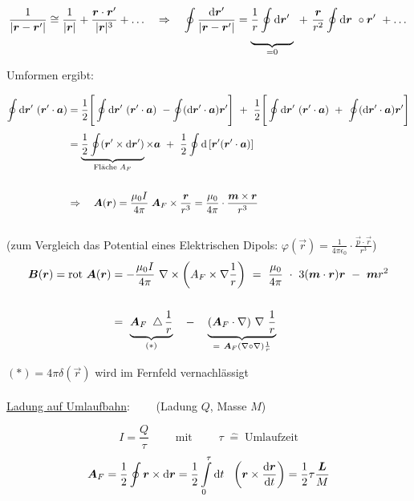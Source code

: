 \begin{equation*}
\frac{1}{|\vec{r}-\vec{r}'|} \cong  \frac{1}{|\vec{r}|} + \frac{\vec{r}\cdot\vec{r}'}{|\vec{r}|^3} + \dotsc \quad \Rightarrow \quad \oint\frac{\mathrm{d}\vec{r}'}{|\vec{r}-\vec{r}'|} = \underbrace{\frac{1}{r} \Oint{}{}{\vec{r}'}}_{=0} \ + \ \frac{\vec{r}}{r^2}\Oint{}{}{\vec{r}} \circ\vec{r}' \ + \dotsc
\end{equation*}

Umformen ergibt:

\begin{align*}
\Oint{}{}{\vec{r}'} (\vec{r}'\cdot\vec{a}) &= \frac{1}{2}\Bigg[\Oint{}{}{\vec{r}'}(\vec{r}'\cdot\vec{a}) \ - \oint(\mathrm{d}\vec{r}'\cdot\vec{a})\vec{r}'\Bigg] \ + \ \frac{1}{2} \Bigg[\Oint{}{}{\vec{r}'}(\vec{r}'\cdot\vec{a}) \ + \ \oint(\mathrm{d}\vec{r}'\cdot\vec{a})\vec{r}'\Bigg]\\
&= \underbrace{\frac{1}{2}\oint(\vec{r}'\times\mathrm{d}\vec{r}')}_{\text{Fläche }A_F} \times\vec{a} \ + \ \frac{1}{2} \oint\mathrm{d}\left[\vec{r}'(\vec{r}'\cdot\vec{a})\right]\\ 
\ \\
& \Rightarrow \quad \vec{A}(\vec{r}) = \frac{\mu_0 I }{4\pi} \; \vec{A}_F\times\frac{\vec{r}}{r^3} = \frac{\mu_0}{4\pi} \cdot \frac{\vec{m}\times\vec{r}}{r^3}
\end{align*}
\ \\
(zum Vergleich das Potential eines Elektrischen Dipols: $\varphi(\vec{r}) = \frac{1}{4\pi\epsilon_0} \cdot \frac{\vec{p}\cdot\vec{r}}{r^3}$)
\ \\
\begin{align*}
\vec{B}(\vec{r}) = \rot\vec{A}(\vec{r}) &= - \frac{\mu_0 I}{4\pi} \ \nabla \times \left(A_F\times\nabla\frac{1}{r}\right) \ = \ \frac{\mu_0}{4\pi} \ \cdot \ 3(\vec{m}\cdot\vec{r})\vec{r} \ - \ \vec{m}r^2\\
\ \\
&= \ \underbrace{\vec{A}_F \ \laplace\frac{1}{r}}_{(*)} \quad - \quad \underbrace{(\vec{A}_F
\cdot\nabla)\ \nabla \ \frac{1}{r}}_{= \ \vec{A}_F (\nabla \circ \nabla) \frac{1}{r}}
\end{align*}

$(*) = 4\pi\delta(\vec{r})$ wird im Fernfeld vernachlässigt
\ \\
\ \\
\underline{Ladung auf Umlaufbahn}:$\qquad$ (Ladung $Q$, Masse $M$)

\begin{equation*}
I = \frac{Q}{\tau} \qquad \text{ mit } \qquad \tau \; \hat{=} \; \text{Umlaufzeit}
\end{equation*}
\begin{equation*}
\vec{A}_F = \frac{1}{2}\oint\vec{r}\times\mathrm{d}\vec{r} = \frac{1}{2}\Int{0}{\tau}{t} \ \left(\vec{r}\times\diff{\vec{r}}{t}\right) =\frac{1}{2}\tau \frac{\vec{L}}{M}
\end{equation*}

